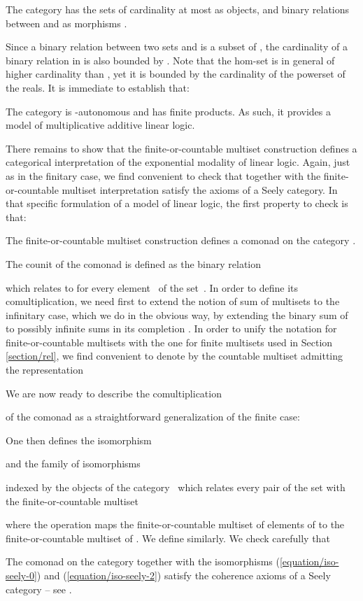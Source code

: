 \documentclass[runningheads,a4paper]{llncs}
\begin{document}
\begin{definition}
The category  has the sets  of cardinality at most
 as objects, and binary relations 
between  and  as morphisms .
\end{definition}
Since a binary relation between two sets  and  is a subset of ,
the cardinality of a binary relation in  is also bounded by .
Note that the hom-set  is in general of higher cardinality than ,
yet it is bounded by the cardinality of the powerset of the reals.
It is immediate to establish that:
\begin{property}
The category  is -autonomous and has finite products.
As such, it provides a model of multiplicative additive linear logic.
\end{property}
There remains to show that the finite-or-countable multiset construction 
defines a categorical interpretation of the exponential modality of linear logic.
Again, just as in the finitary case, we find convenient to check that  together 
with the finite-or-countable multiset interpretation  satisfy the axioms of a Seely category.
In that specific formulation of a model of linear logic, the first property to check is that:
\begin{property}
The finite-or-countable multiset construction  defines 
a comonad on the category .
\end{property}
The counit of the comonad is defined as the binary relation

which relates  to  for every element~ of the set~. 
In order to define its comultiplication, we need first to extend the notion of sum 
of multisets to the infinitary case, which we do in the obvious way, by extending
the binary sum of~ to possibly infinite sums in its completion .
In order to unify the notation for finite-or-countable multisets with the one for finite multisets used in Section \ref{section/rel}, 
we find convenient to denote by  the countable multiset admitting the representation 


We are now ready to describe the comultiplication 
 
of the comonad  as a straightforward generalization of the finite case:

One then defines the isomorphism

and the family of isomorphisms

indexed by the objects  of the category~ which relates 
every pair  of the set  with the finite-or-countable multiset

where the operation  maps the finite-or-countable multiset  of elements of
 to the finite-or-countable multiset   of . We define
  similarly.
We check carefully that
\begin{property}
The comonad  on the category  
together with the isomorphisms (\ref{equation/iso-seely-0}) and (\ref{equation/iso-seely-2})
satisfy the coherence axioms of a Seely category -- see \cite{models-of-linear-logic}.
\end{property}
\end{document}
